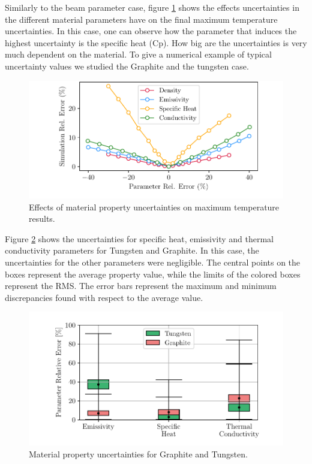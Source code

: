Similarly to the beam parameter case, figure  \ref{fig:MatPar} shows the effects uncertainties in the different material parameters have on the final maximum temperature uncertainties. In this case, one can observe how the parameter that induces the highest uncertainty is the specific heat (Cp). How big are the uncertainties is very much dependent on the material. To give a numerical example of typical uncertainty values we studied the Graphite and the tungsten case. 
\begin{figure}[h]
    \centering
    \includegraphics[width=1.0\columnwidth]{MaterialParameterUncertainty/MatParUnc.pdf}
    \caption{Effects of material property uncertainties on maximum temperature results.}
    \label{fig:MatPar}
\end{figure}

Figure \ref{fig:MatPropUnc} shows the uncertainties for specific heat, emissivity and thermal conductivity parameters for Tungsten and Graphite. In this case, the uncertainties for the other parameters were negligible. The central points on the boxes represent the average property value, while the limits of the colored boxes represent the RMS. The error bars represent the maximum and minimum discrepancies found with respect to the average value. 
\begin{figure}[h]
    \centering
    \includegraphics[width=1.0\columnwidth]{PlotTungstenGraphiteUncertainty/GraphTungsUnc.pdf}
    \caption{Material property uncertainties for Graphite and Tungsten. }
    \label{fig:MatPropUnc}
\end{figure}

